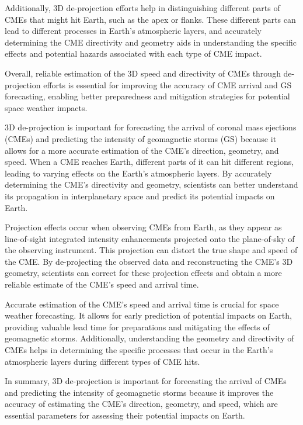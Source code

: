 Additionally, 3D de-projection efforts help in distinguishing different parts of CMEs that might hit Earth, such as the apex or flanks. These different parts can lead to different processes in Earth's atmospheric layers, and accurately determining the CME directivity and geometry aids in understanding the specific effects and potential hazards associated with each type of CME impact.

Overall, reliable estimation of the 3D speed and directivity of CMEs through de-projection efforts is essential for improving the accuracy of CME arrival and GS forecasting, enabling better preparedness and mitigation strategies for potential space weather impacts.

3D de-projection is important for forecasting the arrival of coronal mass ejections (CMEs) and predicting the intensity of geomagnetic storms (GS) because it allows for a more accurate estimation of the CME's direction, geometry, and speed. When a CME reaches Earth, different parts of it can hit different regions, leading to varying effects on the Earth's atmospheric layers. By accurately determining the CME's directivity and geometry, scientists can better understand its propagation in interplanetary space and predict its potential impacts on Earth.

Projection effects occur when observing CMEs from Earth, as they appear as line-of-sight integrated intensity enhancements projected onto the plane-of-sky of the observing instrument. This projection can distort the true shape and speed of the CME. By de-projecting the observed data and reconstructing the CME's 3D geometry, scientists can correct for these projection effects and obtain a more reliable estimate of the CME's speed and arrival time.

Accurate estimation of the CME's speed and arrival time is crucial for space weather forecasting. It allows for early prediction of potential impacts on Earth, providing valuable lead time for preparations and mitigating the effects of geomagnetic storms. Additionally, understanding the geometry and directivity of CMEs helps in determining the specific processes that occur in the Earth's atmospheric layers during different types of CME hits.

In summary, 3D de-projection is important for forecasting the arrival of CMEs and predicting the intensity of geomagnetic storms because it improves the accuracy of estimating the CME's direction, geometry, and speed, which are essential parameters for assessing their potential impacts on Earth.


